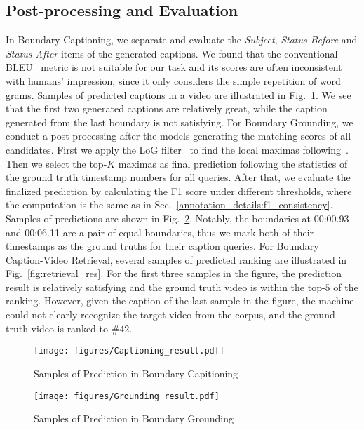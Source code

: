\documentclass[runningheads]{llncs}
\begin{document}
\subsection{Post-processing and Evaluation}

In Boundary Captioning, we separate and evaluate the \textit{Subject}, \textit{Status Before} and \textit{Status After} items of the generated captions. We found that the conventional BLEU~\cite{papineni-etal-2002-bleu} metric is not suitable for our task and its scores are often inconsistent with humans’ impression, since it only considers the simple repetition of word grams. Samples of predicted captions in a video are illustrated in Fig.~\ref{fig:captioning_res}. We see that the first two generated captions are relatively great, while the caption generated from the last boundary is not satisfying.
For Boundary Grounding, we conduct a post-processing after the models generating the matching scores of all candidates. First we apply the LoG filter~\cite{lindeberg1998feature} to find the local maximas following~\cite{shou2021generic}. Then we select the top-$K$ maximas as final prediction following the statistics of the ground truth timestamp numbers for all queries. After that, we evaluate the finalized prediction by calculating the F1 score under different thresholds, where the computation is the same as in Sec.~\ref{annotation_details:f1_consistency}. Samples of predictions are shown in Fig.~\ref{fig:grounding_res}. Notably, the boundaries at 00:00.93 and 00:06.11 are a pair of equal boundaries, thus we mark both of their timestamps as the ground truths for their caption queries.
For Boundary Caption-Video Retrieval, several samples of predicted ranking are illustrated in Fig.~\ref{fig:retrieval_res}. For the first three samples in the figure, the prediction result is relatively satisfying and the ground truth video is within the top-$5$ of the ranking. However, given the caption of the last sample in the figure, the machine could not clearly recognize the target video from the corpus, and the ground truth video is ranked to \#$42$.




\begin{figure}[t]
\centering
\texttt{[image: figures/Captioning\_result.pdf]}
\setlength{\abovecaptionskip}{0.9cm}
\caption{Samples of Prediction in Boundary Capitioning}
\label{fig:captioning_res}
\end{figure}

\begin{figure}[t]
\centering
\texttt{[image: figures/Grounding\_result.pdf]}
\setlength{\abovecaptionskip}{0.9cm}
\caption{Samples of Prediction in Boundary Grounding}
\label{fig:grounding_res}
\end{figure}
\end{document}
